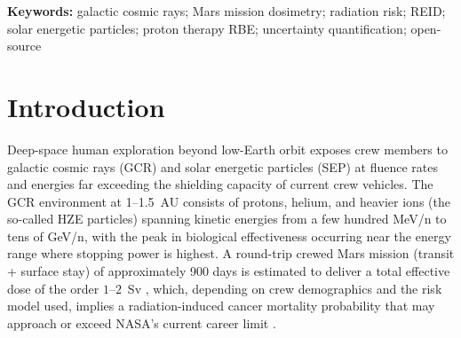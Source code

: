 \documentclass[12pt,letterpaper]{article}
\newcommand{\keVum}{\,\mathrm{keV\,\mu m^{-1}}}
\newcommand{\Qeff}{Q_\mathrm{eff}}
\newcommand{\LETd}{\overline{L}_D}
\begin{document}
\begin{abstract}
Per-species $\LETd$ decomposition reveals that carbon ions contribute
approximately $59\%$ of unshielded GCR absorbed dose at a field
$\LETd \approx 18.7\keVum$, yielding $\Qeff = 2.60$, consistent with
the MSL/RAD measured value of $2.62 \pm 0.14$ within measurement
uncertainty.
Sixteen g/cm$^2$ of aluminum reduces the carbon fraction to $31\%$
and the field $\LETd$ to $4.1\keVum$, bridging toward the LET range of
clinical proton therapy Bragg peaks.
Wedenberg \citep{wedenberg2013} and McNamara \citep{mcnamara2015} proton RBE
models agree with OpenTOPAS-RBE scorer output to within mean absolute error
$<10^{-3}$ for V79 cells (self-consistency check for clinical cell lines),
enabling consistent comparison of space and clinical radiation quality factors
from a single codebase.
All source code, 103 automated tests, validation data, and TOPAS geometry
files are freely available at \url{https://github.com/aryanhshah8/gcr-dosimetry-pipeline}.

\end{abstract}

\textbf{Keywords:}
galactic cosmic rays; Mars mission dosimetry; radiation risk; REID;
solar energetic particles; proton therapy RBE; uncertainty quantification;
open-source

\section{Introduction}
\label{sec:intro}

Deep-space human exploration beyond low-Earth orbit exposes crew members to
galactic cosmic rays (GCR) and solar energetic particles (SEP) at fluence
rates and energies far exceeding the shielding capacity of current crew
vehicles.
The GCR environment at 1--1.5~AU consists of protons, helium, and heavier ions
(the so-called HZE particles) spanning kinetic energies from a few
hundred MeV/n to tens of GeV/n, with the peak in biological effectiveness
occurring near the energy range where stopping power is highest.
A round-trip crewed Mars mission (transit + surface stay) of approximately
900 days is estimated to deliver a total effective dose of the order
$1$--$2$~Sv \citep{zeitlin2013}, which, depending on crew demographics and
the risk model used, implies a radiation-induced cancer mortality probability
that may approach or exceed NASA's current career limit \citep{cucinotta2013}.
\end{document}

